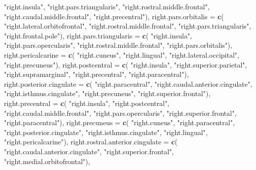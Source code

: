 \documentclass[
]{article}
\newenvironment{Shaded}{\begin{snugshade}}{\end{snugshade}}
\newcommand{\DataTypeTok}[1]{\textcolor[rgb]{0.13,0.29,0.53}{#1}}
\newcommand{\KeywordTok}[1]{\textcolor[rgb]{0.13,0.29,0.53}{\textbf{#1}}}
\newcommand{\NormalTok}[1]{#1}
\newcommand{\StringTok}[1]{\textcolor[rgb]{0.31,0.60,0.02}{#1}}
\begin{document}
\begin{Shaded}
\begin{Highlighting}[]
   \StringTok{"right.insula"}\NormalTok{, }\StringTok{"right.pars.triangularis"}\NormalTok{, }\StringTok{"right.rostral.middle.frontal"}\NormalTok{,}
   \StringTok{"right.caudal.middle.frontal"}\NormalTok{, }\StringTok{"right.precentral"}\NormalTok{),}
 \DataTypeTok{right.pars.orbitalis =} \KeywordTok{c}\NormalTok{(}
   \StringTok{"right.lateral.orbitofrontal"}\NormalTok{, }\StringTok{"right.rostral.middle.frontal"}\NormalTok{,}
   \StringTok{"right.pars.triangularis"}\NormalTok{, }\StringTok{"right.frontal.pole"}\NormalTok{),}
 \DataTypeTok{right.pars.triangularis =} \KeywordTok{c}\NormalTok{(}
   \StringTok{"right.insula"}\NormalTok{, }\StringTok{"right.pars.opercularis"}\NormalTok{, }\StringTok{"right.rostral.middle.frontal"}\NormalTok{,}
   \StringTok{"right.pars.orbitalis"}\NormalTok{),}
 \DataTypeTok{right.pericalcarine =} \KeywordTok{c}\NormalTok{(}
   \StringTok{"right.cuneus"}\NormalTok{, }\StringTok{"right.lingual"}\NormalTok{, }\StringTok{"right.lateral.occipital"}\NormalTok{,}
    \StringTok{"right.precuneus"}\NormalTok{),}
 \DataTypeTok{right.postcentral =} \KeywordTok{c}\NormalTok{(}
   \StringTok{"right.insula"}\NormalTok{, }\StringTok{"right.superior.parietal"}\NormalTok{, }\StringTok{"right.supramarginal"}\NormalTok{,}
   \StringTok{"right.precentral"}\NormalTok{, }\StringTok{"right.paracentral"}\NormalTok{),}
 \DataTypeTok{right.posterior.cingulate =} \KeywordTok{c}\NormalTok{(}
   \StringTok{"right.paracentral"}\NormalTok{, }\StringTok{"right.caudal.anterior.cingulate"}\NormalTok{, }\StringTok{"right.isthmus.cingulate"}\NormalTok{,}
   \StringTok{"right.precuneus"}\NormalTok{, }\StringTok{"right.superior.frontal"}\NormalTok{),}
 \DataTypeTok{right.precentral =} \KeywordTok{c}\NormalTok{(}
   \StringTok{"right.insula"}\NormalTok{, }\StringTok{"right.postcentral"}\NormalTok{, }\StringTok{"right.caudal.middle.frontal"}\NormalTok{,}
   \StringTok{"right.pars.opercularis"}\NormalTok{, }\StringTok{"right.superior.frontal"}\NormalTok{, }\StringTok{"right.paracentral"}\NormalTok{),}
 \DataTypeTok{right.precuneus =} \KeywordTok{c}\NormalTok{(}
   \StringTok{"right.cuneus"}\NormalTok{, }\StringTok{"right.paracentral"}\NormalTok{, }\StringTok{"right.posterior.cingulate"}\NormalTok{,}
   \StringTok{"right.isthmus.cingulate"}\NormalTok{, }\StringTok{"right.lingual"}\NormalTok{, }\StringTok{"right.pericalcarine"}\NormalTok{),}
 \DataTypeTok{right.rostral.anterior.cingulate =} \KeywordTok{c}\NormalTok{(}
   \StringTok{"right.caudal.anterior.cingulate"}\NormalTok{, }\StringTok{"right.superior.frontal"}\NormalTok{,}
   \StringTok{"right.medial.orbitofrontal"}\NormalTok{),}

\end{Highlighting}
\end{Shaded}
\end{document}
